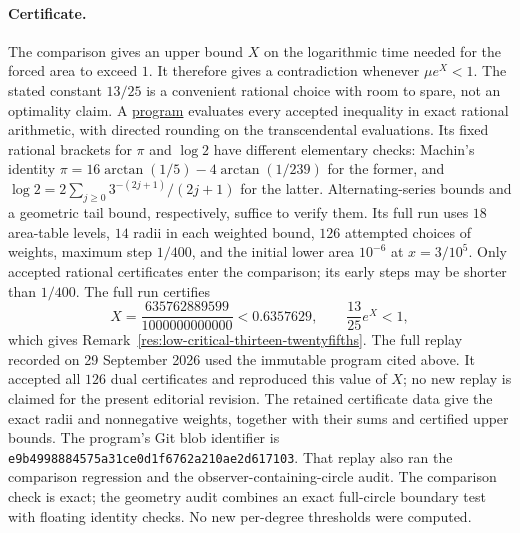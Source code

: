 \documentclass[11pt]{article}
\begin{document}
\paragraph{Certificate.}
The comparison gives an upper bound $X$ on the logarithmic time needed
for the forced area to exceed $1$. It therefore gives a contradiction
whenever $\mu e^X<1$. The stated constant $13/25$ is a convenient rational
choice with room to spare, not an optimality claim. A
\href{https://github.com/wcook04/plectis-erdos/blob/f36a98bf3d3e6f65f1074e3b800e3293d5b8a51a/ErdosProblems/Erdos1041/scripts/check_erdos1041_angular_budget_closure.py}{program} evaluates
every accepted inequality in exact rational arithmetic, with directed rounding
on the transcendental evaluations. Its fixed rational brackets for $\pi$
and $\log2$ have different elementary checks: Machin's identity
$\pi=16\arctan(1/5)-4\arctan(1/239)$ for the former, and
$\log2=2\sum_{j\ge0}3^{-(2j+1)}/(2j+1)$ for the latter.
Alternating-series bounds and a geometric tail bound, respectively,
suffice to verify them. Its full run uses $18$ area-table levels,
$14$ radii in each weighted bound,
$126$ attempted choices of weights, maximum step $1/400$, and the
initial lower area $10^{-6}$ at $x=3/10^5$. Only accepted rational
certificates enter the comparison; its early steps may be shorter than
$1/400$. The full run
certifies
\[
 X=\frac{635762889599}{1000000000000}<0.6357629,
 \qquad \frac{13}{25}e^{X}<1,
\]
which gives Remark~\ref{res:low-critical-thirteen-twentyfifths}.
The full replay recorded on 29 September 2026 used
the immutable program cited above. It accepted all $126$ dual
certificates and reproduced this value of $X$; no new replay is claimed
for the present editorial revision. The retained certificate data give the exact radii and nonnegative
weights, together with their sums and certified upper bounds. The program's Git blob identifier is
\texttt{e9b4998884575a31ce0d1f6762a210ae2d617103}.
That replay also ran the comparison regression and the
observer-containing-circle audit. The comparison check is exact; the geometry audit combines
an exact full-circle boundary test with floating identity checks.
No new per-degree thresholds were computed.
\end{document}
